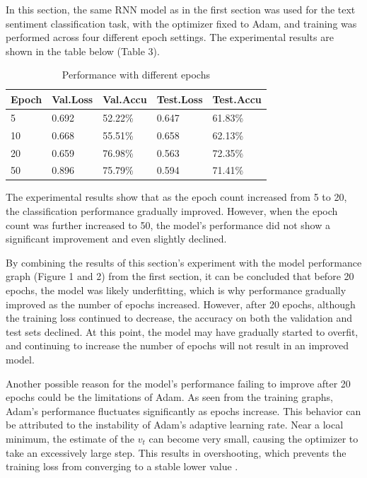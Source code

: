 \documentclass[letterpaper]{article} %
\begin{document}
In this section, the same RNN model as in the first section was used for the text sentiment classification task, with the optimizer fixed to Adam, and training was performed across four different epoch settings. The experimental results are shown in the table below (Table 3).


\begin{table}[H] %
	\centering %
	\caption{Performance with different epochs} 
	\label{tab:various epoch} 	
	\begin{tabularx}{\columnwidth}{l X X X X}
		\toprule 
		\textbf{Epoch} & \textbf{Val.Loss} & \textbf{Val.Accu} & \textbf{Test.Loss} & \textbf{Test.Accu} \\ 
		\midrule 
		5 & 0.692 & 52.22\% & 0.647 & 61.83\%\\
		10 & 0.668 & 55.51\% & 0.658 & 62.13\%\\
		20 & 0.659 & 76.98\% & 0.563 & 72.35\% \\
		50 & 0.896 & 75.79\% & 0.594 & 71.41\% \\
		\bottomrule 
	\end{tabularx}
\end{table}

The experimental results show that as the epoch count increased from 5 to 20, the classification performance gradually improved. However, when the epoch count was further increased to 50, the model's performance did not show a significant improvement and even slightly declined.

By combining the results of this section's experiment with the model performance graph (Figure 1 and 2) from the first section, it can be concluded that before 20 epochs, the model was likely underfitting, which is why performance gradually improved as the number of epochs increased. However, after 20 epochs, although the training loss continued to decrease, the accuracy on both the validation and test sets declined. At this point, the model may have gradually started to overfit, and continuing to increase the number of epochs will not result in an improved model.

Another possible reason for the model's performance failing to improve after 20 epochs could be the limitations of Adam. As seen from the training graphs, Adam's performance fluctuates significantly as epochs increase. This behavior can be attributed to the instability of Adam's adaptive learning rate. Near a local minimum, the estimate of the $v_t$ can become very small, causing the optimizer to take an excessively large step. This results in overshooting, which prevents the training loss from converging to a stable lower value \cite{reddi2019convergence}.
	
\end{document}
